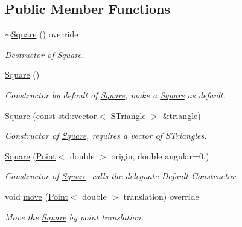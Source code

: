 \subsection*{Public Member Functions}
\begin{DoxyCompactItemize}
\item 
\mbox{\label{classSquare_ab0677a46d02aa78bc0b7be8c06f9dc37}} 
\hyperlink{classSquare_ab0677a46d02aa78bc0b7be8c06f9dc37}{$\sim$\+Square} () override
\begin{DoxyCompactList}\small\item\em Destructor of \hyperlink{classSquare}{Square}. \end{DoxyCompactList}\item 
\mbox{\label{classSquare_a3dc7ff9aefc2725172b5d3153973d243}} 
\hyperlink{classSquare_a3dc7ff9aefc2725172b5d3153973d243}{Square} ()
\begin{DoxyCompactList}\small\item\em Constructor by default of \hyperlink{classSquare}{Square}, make a \hyperlink{classSquare}{Square} as default. \end{DoxyCompactList}\item 
\hyperlink{classSquare_ad5556d633716f2daa1f2f7e3b52073cc}{Square} (const std\+::vector$<$ \hyperlink{classSTriangle}{S\+Triangle} $>$ \&triangle)
\begin{DoxyCompactList}\small\item\em Constructor of \hyperlink{classSquare}{Square}, requires a vector of S\+Triangles. \end{DoxyCompactList}\item 
\hyperlink{classSquare_a5e485c4484e9f56fefbdd47bc7f203f1}{Square} (\hyperlink{classPoint}{Point}$<$ double $>$ origin, double angular=0.)
\begin{DoxyCompactList}\small\item\em Constructor of \hyperlink{classSquare}{Square}, calls the deleguate Default Constructor. \end{DoxyCompactList}\item 
void \hyperlink{classSquare_a6be02369ff07934179f6bfd6360fb9d3}{move} (\hyperlink{classPoint}{Point}$<$ double $>$ translation) override
\begin{DoxyCompactList}\small\item\em Move the \hyperlink{classSquare}{Square} by point translation. \end{DoxyCompactList}\item 

\end{DoxyCompactItemize}
